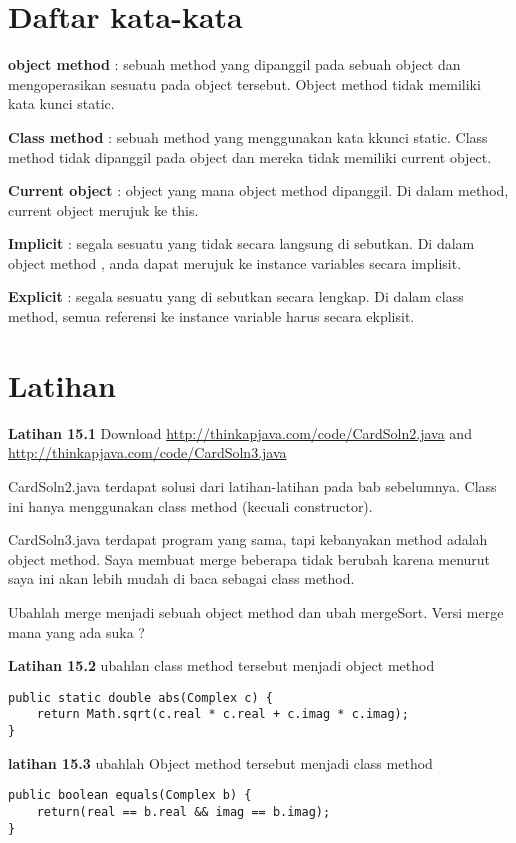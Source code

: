 \section{Daftar kata-kata}%

\textbf{object method} : sebuah method yang dipanggil pada sebuah object dan mengoperasikan sesuatu pada object tersebut. Object method tidak memiliki kata kunci static.

\textbf{Class method} : sebuah method yang menggunakan kata kkunci static. Class method tidak dipanggil pada object dan mereka tidak memiliki current object.

\textbf{Current object} : object yang mana object method dipanggil. Di dalam method, current object merujuk ke this.

\textbf{Implicit} : segala sesuatu yang tidak secara langsung di sebutkan. Di dalam object method , anda dapat merujuk ke instance variables secara implisit.

\textbf{Explicit} : segala sesuatu yang di sebutkan secara lengkap. Di dalam class method, semua referensi ke instance variable harus secara ekplisit.

\section{Latihan}%

\textbf{Latihan 15.1} Download \url{http://thinkapjava.com/code/CardSoln2.java}  and \url{http://thinkapjava.com/code/CardSoln3.java}

CardSoln2.java terdapat solusi dari latihan-latihan pada bab sebelumnya. Class ini hanya menggunakan class method (kecuali constructor).

CardSoln3.java terdapat program yang sama, tapi kebanyakan method adalah object method. Saya membuat merge beberapa tidak berubah karena menurut saya ini akan lebih mudah di baca sebagai class method. 

Ubahlah merge menjadi sebuah object method dan ubah mergeSort. Versi merge mana yang ada suka ?

\textbf{Latihan 15.2} ubahlan class method tersebut menjadi object method 
\begin{lstlisting}
public static double abs(Complex c) {
	return Math.sqrt(c.real * c.real + c.imag * c.imag);
}
\end{lstlisting}

\textbf{latihan 15.3} ubahlah Object method tersebut menjadi class method 
\begin{lstlisting}
public boolean equals(Complex b) {
	return(real == b.real && imag == b.imag);
}
\end{lstlisting}

